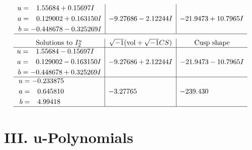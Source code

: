 \documentclass[1p]{elsarticle_modified}
\theoremstyle{definition}
\newcommand{\I}{\sqrt{-1}}
\begin{document}
$$\begin{array}{c|c|c}
\begin{aligned}
u &= \phantom{-}1.55684 + 0.15697 I \\
a &= \phantom{-}0.129002 + 0.163150 I \\
b &= -0.448678 - 0.325269 I\end{aligned}
 & -9.27686 - 2.12244 I & -21.9473 + 10.7965 I\\
 \hline 
 \end{array}$$\newpage$$\begin{array}{c|c|c}  
\text{Solutions to }I^u_{2}& \I (\text{vol} + \sqrt{-1}CS) & \text{Cusp shape}\\
 \hline 
\begin{aligned}
u &= \phantom{-}1.55684 - 0.15697 I \\
a &= \phantom{-}0.129002 - 0.163150 I \\
b &= -0.448678 + 0.325269 I\end{aligned}
 & -9.27686 + 2.12244 I & -21.9473 - 10.7965 I \\ \hline\begin{aligned}
u &= -0.233875\phantom{ +0.000000I} \\
a &= \phantom{-}0.645810\phantom{ +0.000000I} \\
b &= \phantom{-}4.99418\phantom{ +0.000000I}\end{aligned}
 & -3.27765\phantom{ +0.000000I} & -239.430\phantom{ +0.000000I}\\
 \hline 
 \end{array}$$\newpage
\newpage\renewcommand{\arraystretch}{1}
\centering \section*{ III. u-Polynomials}
\end{document}
